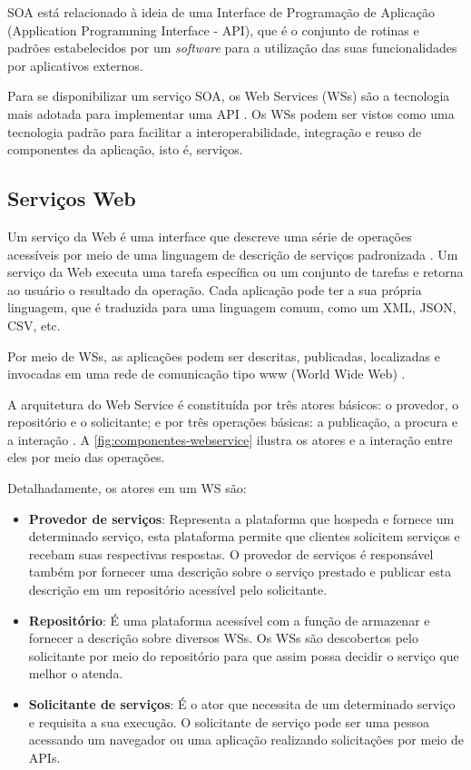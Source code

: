 	SOA está relacionado à ideia de uma Interface de Programação de Aplicação (Application Programming Interface - API), que é o conjunto de rotinas e padrões estabelecidos por um \textit{software} para a utilização das suas funcionalidades por aplicativos externos.
	
	Para se disponibilizar um serviço SOA, os Web Services (WSs) são a tecnologia mais adotada para
	implementar uma API \cite{souit2013soa}. Os WSs podem ser vistos como uma tecnologia padrão para facilitar a interoperabilidade, integração e reuso de componentes da aplicação, isto é, serviços.
	
	\subsection{Serviços Web}
	
	Um serviço da Web é uma interface que descreve uma série de operações acessíveis por meio de uma linguagem de descrição de serviços padronizada \cite{gottschalk2002webservices}. Um serviço da Web executa uma tarefa específica ou um conjunto de tarefas e retorna ao usuário o resultado da operação. Cada aplicação pode ter a sua própria linguagem, que é traduzida para uma linguagem comum, como um XML, JSON, CSV, etc.
	
	Por meio de WSs, as aplicações podem ser descritas, publicadas, localizadas e invocadas em uma rede de comunicação tipo www (World Wide Web) \cite{souit2013soa}.
	
	A arquitetura do Web Service é constituída por três atores básicos: o provedor, o repositório e o solicitante; e por três operações básicas: a publicação, a procura e a interação \cite{gottschalk2002webservices}. A \autoref{fig:componentes-webservice} ilustra os atores e a interação entre eles por meio das operações.
	
	Detalhadamente, os atores em um WS são:
	
	\begin{itemize}
		\item \textbf{Provedor de serviços}: Representa a plataforma que hospeda e fornece um determinado serviço, esta plataforma permite que clientes solicitem serviços e recebam suas respectivas respostas. O provedor de serviços é responsável também por fornecer uma descrição sobre o serviço prestado e publicar esta descrição em um repositório acessível pelo solicitante.
		
		\item \textbf{Repositório}: É uma plataforma acessível com a função de armazenar e fornecer a descrição sobre diversos WSs. Os WSs são descobertos pelo solicitante por meio do repositório para que assim possa decidir o serviço que melhor o atenda.
		
		\item \textbf{Solicitante de serviços}: É o ator que necessita de um determinado serviço e requisita a sua execução. O solicitante de serviço pode ser uma pessoa acessando um navegador ou uma aplicação realizando solicitações por meio de APIs.		
	\end{itemize}

